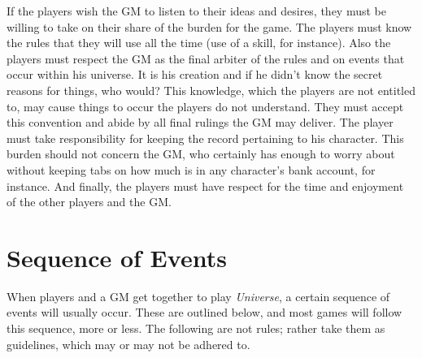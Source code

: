 If the players wish the GM to listen to their ideas and desires, they
must be willing to take on their share of the burden for the game.
The players must know the rules that they will use all the time (use
of a skill, for instance).  Also the players must respect the GM as
the final arbiter of the rules and on events that occur within his
universe.  It is his creation and if he didn't know the secret reasons
for things, who would? This knowledge, which the players are not
entitled to, may cause things to occur the players do not understand.
They must accept this convention and abide by all final rulings the GM
may deliver.  The player must take responsibility for keeping the
record pertaining to his character.  This burden should not concern
the GM, who certainly has enough to worry about without keeping tabs
on how much is in any character's bank account, for instance.  And
finally, the players must have respect for the time and enjoyment of
the other players and the GM.



\section{Sequence of Events}
\label{sec:sequence-events}

When players and a GM get together to play \emph{Universe}, a certain
sequence of events will usually occur.  These are outlined below, and
most games will follow this sequence, more or less.  The following are
not rules; rather take them as guidelines, which may or may not be
adhered to.

